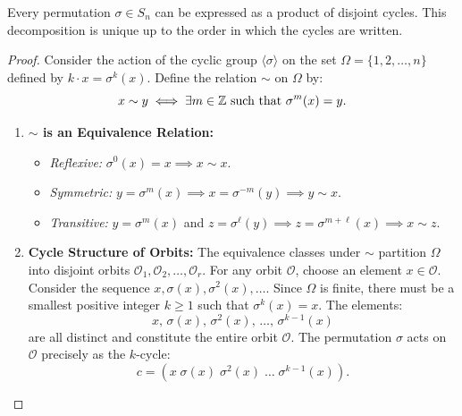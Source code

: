 \begin{theorem}
\label{thm:cycle_decomp}
Every permutation $\sigma \in S_n$ can be expressed as a product of disjoint cycles. This decomposition is unique up to the order in which the cycles are written.
\end{theorem}

\begin{proof}
Consider the action of the cyclic group $\langle \sigma \rangle$ on the set $\Omega = \{1, 2, \dots, n\}$ defined by $k \cdot x = \sigma^k(x)$.
Define the relation $\sim$ on $\Omega$ by:
\begin{equation*}
x \sim y \iff \exists m \in \mathbb{Z} \text{ such that } \sigma^m(x) = y.
\end{equation*}
\begin{enumerate}[label=\arabic*., leftmargin=*]
    \item \textbf{$\sim$ is an Equivalence Relation:}
    \begin{itemize}[leftmargin=1.5em, itemsep=3pt]
        \item \emph{Reflexive:} $\sigma^0(x) = x \implies x \sim x$.
        \item \emph{Symmetric:} $y = \sigma^m(x) \implies x = \sigma^{-m}(y) \implies y \sim x$.
        \item \emph{Transitive:} $y = \sigma^m(x)$ and $z = \sigma^\ell(y) \implies z = \sigma^{m+\ell}(x) \implies x \sim z$.
    \end{itemize}
    
    \item \textbf{Cycle Structure of Orbits:}
    The equivalence classes under $\sim$ partition $\Omega$ into disjoint orbits $\mathcal{O}_1, \mathcal{O}_2, \dots, \mathcal{O}_r$.
    For any orbit $\mathcal{O}$, choose an element $x \in \mathcal{O}$.
    Consider the sequence $x, \sigma(x), \sigma^2(x), \dots$.
    Since $\Omega$ is finite, there must be a smallest positive integer $k \ge 1$ such that $\sigma^k(x) = x$.
    The elements:
    \begin{equation*}
    x, \, \sigma(x), \, \sigma^2(x), \, \dots, \, \sigma^{k-1}(x)
    \end{equation*}
    are all distinct and constitute the entire orbit $\mathcal{O}$.
    The permutation $\sigma$ acts on $\mathcal{O}$ precisely as the $k$-cycle:
    \begin{equation*}
    c = (x \; \sigma(x) \; \sigma^2(x) \; \dots \; \sigma^{k-1}(x)).
    \end{equation*}
    

\end{enumerate}
\end{proof}
